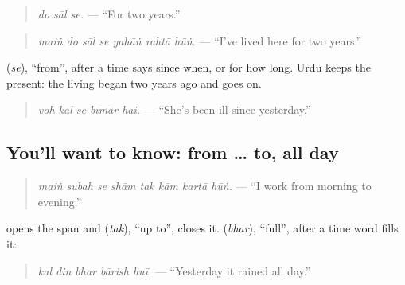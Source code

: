 \begin{quote}
\emph{do sāl se.} — \textquotedblleft{}For two years.\textquotedblright{}
\end{quote}

\begin{quote}
\textbf{      }
\end{quote}

\begin{quote}
\emph{maiṅ do sāl se yahāṅ rahtā hūṅ.} — \textquotedblleft{}I've lived here for two years.\textquotedblright{}
\end{quote}

\textbf{} (\emph{se}), \textquotedblleft{}from\textquotedblright{}, after a time says since when, or for how long. Urdu keeps the present: the living began two years ago and goes on.

\begin{quote}
\textbf{    }
\end{quote}

\begin{quote}
\emph{voh kal se bīmār hai.} — \textquotedblleft{}She's been ill since yesterday.\textquotedblright{}
\end{quote}

\subsection*{You'll want to know: from … to, all day}
\begin{quote}
\textbf{       }
\end{quote}

\begin{quote}
\emph{maiṅ subah se shām tak kām kartā hūṅ.} — \textquotedblleft{}I work from morning to evening.\textquotedblright{}
\end{quote}

\textbf{} opens the span and \textbf{} (\emph{tak}), \textquotedblleft{}up to\textquotedblright{}, closes it. \textbf{} (\emph{bhar}), \textquotedblleft{}full\textquotedblright{}, after a time word fills it:

\begin{quote}
\textbf{    }
\end{quote}

\begin{quote}
\emph{kal din bhar bārish huī.} — \textquotedblleft{}Yesterday it rained all day.\textquotedblright{}
\end{quote}

